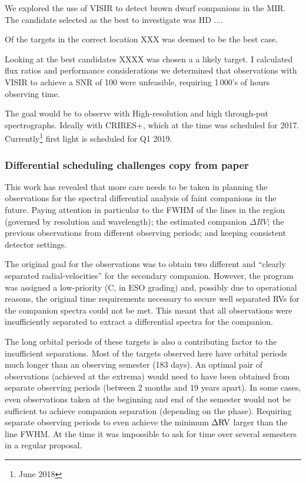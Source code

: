 We explored the use of {VISIR} to detect brown dwarf companions in the {MIR}. The candidate selected as the best to investigate was HD ....


Of the targets in the correct location XXX was deemed to be the best case.

Looking at the best candidates XXXX was chosen a a likely target. I calculated flux ratios and performance considerations we determined that observations with VISIR to achieve a {SNR} of 100 were unfeasible, requiring 1\,000's of hours observing time.

The goal would be to observe with High-resolution and high through-put spectrographs. Ideally with {CRIRES+}, which at the time was scheduled for 2017. Currently\footnote{June 2018} first light is scheduled for Q1 2019.




\subsubsection{Differential scheduling challenges {copy from paper}}
\label{subsubsec:differential-schedualing}
This work has revealed that more care needs to be taken in planning the observations for the spectral differential analysis of faint companions in the future.
Paying attention in particular to the {FWHM} of the lines in the region (governed by resolution and wavelength); the estimated companion \(\Delta {RV}\); the previous observations from different observing periods; and keeping consistent detector settings.

The original goal for the observations was to obtain two different and ``clearly separated radial-velocities'' for the secondary companion.
However, the program was assigned a low-priority (C, in ESO grading) and, possibly due to operational reasons, the original time requirements necessary to secure well separated RVs for the companion spectra could not be met.
This meant that all observations were insufficiently separated to extract a differential spectra for the companion.

The long orbital periods of these targets is also a contributing factor to the insufficient separations.
Most of the targets observed here have orbital periods much longer than an observing semester (183 days).
An optimal pair of observations (achieved at the extrema) would need to have been obtained from separate observing periods (between 2 months and 19 years apart).
In some cases, even observations taken at the beginning and end of the semester would not be sufficient to achieve companion separation (depending on the phase).
Requiring separate observing periods to even achieve the minimum \(\Delta \rm {RV}\) larger than the line {FWHM}.
At the time it was impossible to ask for time over several semesters in a regular proposal.


